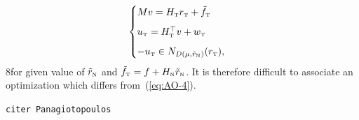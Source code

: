 \begin{equation}\label{eq:soccp1-tangent}
  \begin{cases}
    M v = {H_\t} {r_\t} + {\tilde f_\t} \\[2mm]
    u_\t = H_\t^\top v + w_\t \\[2mm]
    -u_\t \in N_{D(\mu,\tilde r_{\n})}(r_\t),
  \end{cases}
\end{equation}
8for  given value of  $\tilde r_{\hbox{\tiny{N}}}$ and $\tilde f_{\hbox{\tiny{T}}} = f + H_{\hbox{\tiny{N}}} \tilde r_{\hbox{\tiny{N}}}$. It is therefore difficult to associate an optimization which differs from~(\ref{eq:AO-4}).  



\texttt{citer Panagiotopoulos}

